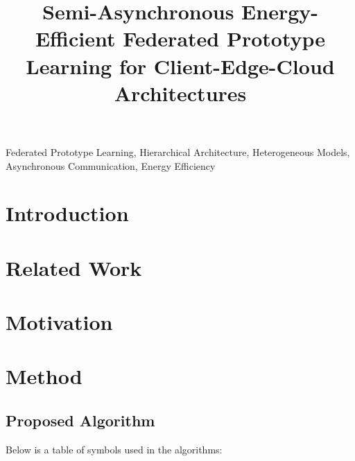 \documentclass[journal]{IEEEtran}
\begin{document}
\title{Semi-Asynchronous Energy-Efficient Federated Prototype Learning for Client-Edge-Cloud Architectures}




\maketitle

\begin{abstract}

\end{abstract}

\begin{IEEEkeywords}
  Federated Prototype Learning, Hierarchical Architecture, Heterogeneous Models, Asynchronous Communication, Energy Efficiency
\end{IEEEkeywords}

\section{Introduction}

\section{Related Work}

\section{Motivation}

\section{Method}
\subsection{Proposed Algorithm}
Below is a table of symbols used in the algorithms:
\end{document}
